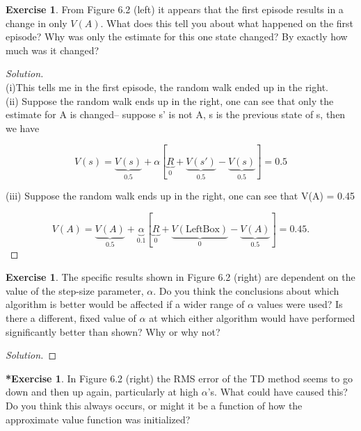 \documentclass[oneside,11pt]{article}
\theoremstyle{definition}
\newtheorem{exer}[thm]{Exercise}
\newtheorem{exerstar}[thm]{*Exercise}
\newenvironment{solution}
{\renewcommand\qedsymbol{$\blacksquare$}\begin{proof}[Solution]} {\end{proof}}
\begin{document}
\begin{exer}
From Figure 6.2 (left) it appears that the first episode results in a change in only $V(A)$. What does this tell you about what happened on the first episode? Why was only the estimate for this one state changed? By exactly how much was it changed?
\end{exer}

\begin{shaded}
\begin{solution} 
~\\
(i)This tells me in the first episode, the random walk ended up in the right. \\
(ii) Suppose the random walk ends up in the right, one can see that only the estimate for A is changed-- suppose s' is not A, s is the previous state of s, then we have 

\[V(s) = \underbrace{V(s)}_{0.5} + \alpha \left [ \underbrace{R}_{0} + \underbrace{V(s')}_{0.5} - \underbrace{V(s)}_{0.5} \right ] = 0.5\]

(iii) Suppose the random walk ends up in the right, one can see that V(A) = 0.45

\[V(A) = \underbrace{V(A)}_{0.5} + \underbrace{\alpha}_{0.1} \left [ \underbrace{R}_{0} + \underbrace{V(\text{LeftBox})}_{0} - \underbrace{V(A)}_{0.5} \right ] = 0.45. \]
\end{solution} 
\end{shaded}

\begin{exer}
The specific results shown in Figure 6.2 (right) are dependent on the value of the step-size parameter, $\alpha$. Do you think the conclusions about which algorithm is better would be affected if a wider range of $\alpha$ values were used? Is there a different, fixed value of $\alpha$ at which either algorithm would have performed significantly better than shown? Why or why not?
\end{exer}

\begin{shaded}
\begin{solution} 


\end{solution} 
\end{shaded}


\begin{exerstar}
 In Figure 6.2 (right) the RMS error of the TD method seems to go down and then up again, particularly at high $\alpha$'s. What could have caused this? Do you think this always occurs, or might it be a function of how the approximate value function was initialized?
\end{exerstar}
\end{document}
